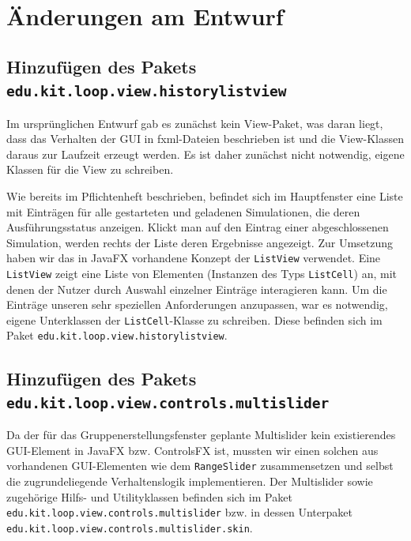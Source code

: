 \documentclass[parskip=full,11pt]{scrartcl}
\begin{document}
\newpage
\section{Änderungen am Entwurf}

\subsection{Hinzufügen des Pakets \texttt{edu.kit.loop.view.historylistview}}
Im ursprünglichen Entwurf gab es zunächst kein View-Paket, was daran liegt, dass das Verhalten der GUI in fxml-Dateien beschrieben ist und die View-Klassen daraus zur Laufzeit erzeugt werden. Es ist daher zunächst nicht notwendig, eigene Klassen für die View zu schreiben.

Wie bereits im Pflichtenheft beschrieben, befindet sich im Hauptfenster eine Liste mit Einträgen für alle gestarteten und geladenen Simulationen, die deren Ausführungsstatus anzeigen. Klickt man auf den Eintrag einer abgeschlossenen Simulation, werden rechts der Liste deren Ergebnisse angezeigt. Zur Umsetzung haben wir das in JavaFX vorhandene Konzept der \texttt{ListView} verwendet. Eine \texttt{ListView} zeigt eine Liste von Elementen (Instanzen des Typs \texttt{ListCell}) an, mit denen der Nutzer durch Auswahl einzelner Einträge interagieren kann. Um die Einträge unseren sehr speziellen Anforderungen anzupassen, war es notwendig, eigene Unterklassen der \texttt{ListCell}-Klasse zu schreiben. Diese befinden sich im Paket \texttt{edu.kit.loop.view.historylistview}.

\subsection{Hinzufügen des Pakets \texttt{edu.kit.loop.view.controls.multislider}}
Da der für das Gruppenerstellungsfenster geplante Multislider kein existierendes GUI-Element in JavaFX bzw. ControlsFX ist, mussten wir einen solchen aus vorhandenen GUI-Elementen wie dem \texttt{RangeSlider} zusammensetzen und selbst die zugrundeliegende Verhaltenslogik implementieren. Der Multislider sowie zugehörige Hilfs- und Utilityklassen befinden sich im Paket \texttt{edu.kit.loop.view.controls.multislider} bzw. in dessen Unterpaket \texttt{edu.kit.loop.view.controls.multislider.skin}.
\end{document}
